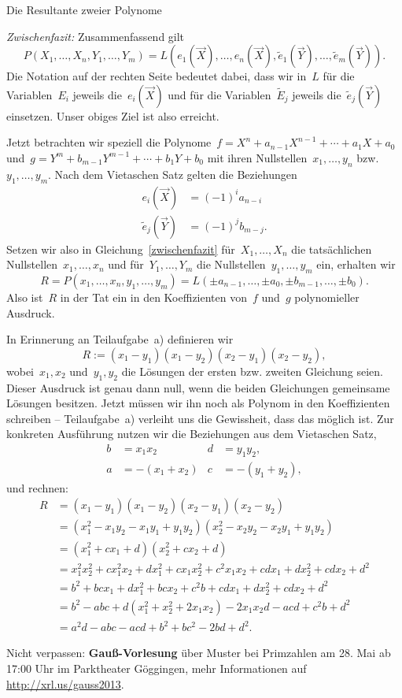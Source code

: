 \documentclass{algblatt}
\begin{document}
\begin{aufgabe}{Die Resultante zweier Polynome}
\begin{loesungE}
\emph{Zwischenfazit:} Zusammenfassend gilt
\begin{equation}\label{zwischenfazit}
  P(X_1,\ldots,X_n, Y_1,\ldots,Y_m) =
  L(e_1(\vec X),\ldots,e_n(\vec X), \widetilde e_1(\vec Y),\ldots,\widetilde e_m(\vec Y)).
\end{equation}
Die Notation auf der rechten Seite bedeutet dabei, dass wir in~$L$ für die
Variablen~$E_i$ jeweils die~$e_i(\vec X)$ und für die Variablen~$\widetilde E_j$ jeweils
die~$\widetilde e_j(\vec Y)$ einsetzen. Unser obiges Ziel ist also erreicht.

Jetzt betrachten wir speziell die Polynome~$f = X^n + a_{n-1}X^{n-1} + \cdots +
a_1X + a_0$ und~$g = Y^m + b_{m-1}Y^{m-1} + \cdots + b_1Y + b_0$ mit ihren
Nullstellen~$x_1,\ldots,y_n$ bzw.~$y_1,\ldots,y_m$. Nach dem Vietaschen Satz
gelten die Beziehungen
\begin{align*}
  e_i(\vec X) &= (-1)^i a_{n-i} \\
  \widetilde e_j(\vec Y) &= (-1)^j b_{m-j}.
\end{align*}
Setzen wir also in Gleichung~\eqref{zwischenfazit} für~$X_1,\ldots,X_n$ die
tatsächlichen Nullstellen~$x_1,\ldots,x_n$ und für~$Y_1,\ldots,Y_m$ die
Nullstellen~$y_1,\ldots,y_m$ ein, erhalten wir
\[ R = P(x_1,\ldots,x_n,y_1,\ldots,y_m) =
  L(\pm a_{n-1},\ldots,\pm a_0, \pm b_{m-1},\ldots,\pm b_0). \]
Also ist~$R$ in der Tat ein in den Koeffizienten von~$f$ und~$g$ polynomieller
Ausdruck.

\item In Erinnerung an Teilaufgabe~a) definieren wir
\[ R := (x_1 - y_1) (x_1 - y_2) (x_2 - y_1) (x_2 - y_2), \]
wobei~$x_1,x_2$ und~$y_1,y_2$ die Lösungen der ersten bzw. zweiten Gleichung
seien. Dieser Ausdruck ist genau dann null, wenn die beiden Gleichungen
gemeinsame Lösungen besitzen. Jetzt müssen wir ihn noch als Polynom in den
Koeffizienten schreiben -- Teilaufgabe~a) verleiht uns die Gewissheit, dass das
möglich ist. Zur konkreten Ausführung nutzen wir die Beziehungen aus dem
Vietaschen Satz,
\begin{align*}
  b &= x_1 x_2 & d &= y_1 y_2, \\
  a &= -(x_1+x_2) & c &= -(y_1 + y_2),
\end{align*}
und rechnen:
\begin{align*}
  R &= (x_1 - y_1) (x_1 - y_2) (x_2 - y_1) (x_2 - y_2) \\
  &= (x_1^2 - x_1y_2 - x_1y_1 + y_1y_2) (x_2^2 - x_2y_2 - x_2y_1 + y_1y_2) \\
  &= (x_1^2 + cx_1 + d) (x_2^2 + cx_2 + d) \\
  &= x_1^2 x_2^2 + c x_1^2 x_2 + d x_1^2 + c x_1 x_2^2 + c^2 x_1 x_2 +
    c d x_1 + d x_2^2 + cd x_2 + d^2 \\
  &= b^2 + bcx_1 + dx_1^2 + bcx_2 + c^2b + cdx_1 + dx_2^2 + cdx_2 + d^2 \\
  &= b^2 - abc + d(x_1^2 + x_2^2 + 2x_1x_2) - 2x_1x_2d - acd + c^2b + d^2 \\
  &= a^2d - abc - acd + b^2 + bc^2 - 2bd + d^2.
\end{align*}
\end{loesungE}
\end{aufgabe}

Nicht verpassen: \textbf{Gauß-Vorlesung} über Muster bei Primzahlen am 28. Mai
ab 17:00 Uhr im Parktheater Göggingen, mehr Informationen auf
\url{http://xrl.us/gauss2013}.
 
\end{document}
